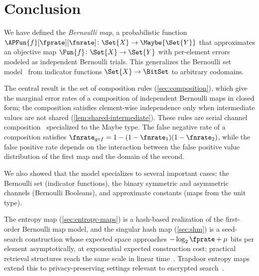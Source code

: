 \documentclass[ ../main.tex]{subfiles}
\begin{document}
\section{Conclusion}
\label{sec:conclusion}

We have defined the \emph{Bernoulli map}, a probabilistic function $\APFun{f}[\fprate][\fnrate] \colon \Set{X} \to \Maybe{\Set{Y}}$ that approximates an objective map $\Fun{f} \colon \Set{X} \to \Set{Y}$ with per-element errors modeled as independent Bernoulli trials. This generalizes the Bernoulli set model~\cite{aset} from indicator functions $\Set{X} \to \BitSet$ to arbitrary codomains.

The central result is the set of composition rules (\cref{sec:composition}), which give the marginal error rates of a composition of independent Bernoulli maps in closed form; the composition satisfies element-wise independence only when intermediate values are not shared (\cref{lem:shared-intermediate}). These rules are serial channel composition~\cite{silverman1955,cover2006} specialized to the Maybe type. The false negative rate of a composition satisfies $\fnrate_{g \circ f} = 1 - (1-\fnrate_1)(1-\fnrate_2)$, while the false positive rate depends on the interaction between the false positive value distribution of the first map and the domain of the second.

We also showed that the model specializes to several important cases: the Bernoulli set (indicator functions), the binary symmetric and asymmetric channels (Bernoulli Booleans), and approximate constants (maps from the unit type).

The entropy map (\cref{sec:entropy-maps}) is a hash-based realization of the first-order Bernoulli map model, and the singular hash map (\cref{sec:shm}) is a seed-search construction whose expected space approaches $-\log_2 \fprate + \mu$ bits per element asymptotically, at exponential expected construction cost; practical retrieval structures reach the same scale in linear time~\cite{dietzfelbinger2008}. Trapdoor entropy maps extend this to privacy-preserving settings relevant to encrypted search~\cite{songWagnerPerrig2000,curtmola2006}.
\end{document}
